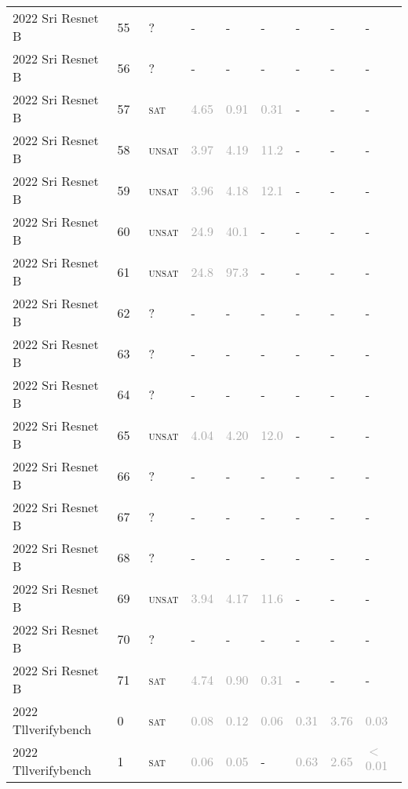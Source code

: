 \begin{center}
{\begin{longtable}{@{}lllllllll@{}}
2022 Sri Resnet B & 55 & ~? & - & - & - & - & - & - \\
2022 Sri Resnet B & 56 & ~? & - & - & - & - & - & - \\
2022 Sri Resnet B & 57 & ~\textsc{sat} & \textcolor{darkgray}{4.65} & \textcolor{darkgray}{0.91} & \textcolor{darkgray}{0.31} & - & - & - \\
2022 Sri Resnet B & 58 & ~\textsc{unsat} & \textcolor{darkgray}{3.97} & \textcolor{darkgray}{4.19} & \textcolor{darkgray}{11.2} & - & - & - \\
2022 Sri Resnet B & 59 & ~\textsc{unsat} & \textcolor{darkgray}{3.96} & \textcolor{darkgray}{4.18} & \textcolor{darkgray}{12.1} & - & - & - \\
2022 Sri Resnet B & 60 & ~\textsc{unsat} & \textcolor{darkgray}{24.9} & \textcolor{darkgray}{40.1} & - & - & - & - \\
2022 Sri Resnet B & 61 & ~\textsc{unsat} & \textcolor{darkgray}{24.8} & \textcolor{darkgray}{97.3} & - & - & - & - \\
2022 Sri Resnet B & 62 & ~? & - & - & - & - & - & - \\
2022 Sri Resnet B & 63 & ~? & - & - & - & - & - & - \\
2022 Sri Resnet B & 64 & ~? & - & - & - & - & - & - \\
2022 Sri Resnet B & 65 & ~\textsc{unsat} & \textcolor{darkgray}{4.04} & \textcolor{darkgray}{4.20} & \textcolor{darkgray}{12.0} & - & - & - \\
2022 Sri Resnet B & 66 & ~? & - & - & - & - & - & - \\
2022 Sri Resnet B & 67 & ~? & - & - & - & - & - & - \\
2022 Sri Resnet B & 68 & ~? & - & - & - & - & - & - \\
2022 Sri Resnet B & 69 & ~\textsc{unsat} & \textcolor{darkgray}{3.94} & \textcolor{darkgray}{4.17} & \textcolor{darkgray}{11.6} & - & - & - \\
2022 Sri Resnet B & 70 & ~? & - & - & - & - & - & - \\
2022 Sri Resnet B & 71 & ~\textsc{sat} & \textcolor{darkgray}{4.74} & \textcolor{darkgray}{0.90} & \textcolor{darkgray}{0.31} & - & - & - \\
\midrule
2022 Tllverifybench & 0 & ~\textsc{sat} & \textcolor{darkgray}{0.08} & \textcolor{darkgray}{0.12} & \textcolor{darkgray}{0.06} & \textcolor{darkgray}{0.31} & \textcolor{darkgray}{3.76} & \textcolor{darkgray}{0.03} \\
2022 Tllverifybench & 1 & ~\textsc{sat} & \textcolor{darkgray}{0.06} & \textcolor{darkgray}{0.05} & - & \textcolor{darkgray}{0.63} & \textcolor{darkgray}{2.65} & \textcolor{darkgray}{$<$0.01} \\

\end{longtable}}
\end{center}
